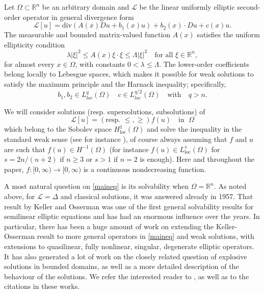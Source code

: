 \documentclass[12pt,a4paper]{amsart}
\numberwithin{equation}{section} %
\theoremstyle{definition}
\theoremstyle{remark}
\def \div {\mathrm{div}}
\begin{document}
Let $\Omega \subset \mathbb{R}^n$ be an arbitrary domain and $\mathcal{L}$ be the linear uniformly elliptic second-order operator in general divergence form 
\begin{equation}\label{form of the eq}
    \mathcal{L}[u] = \div\left(A(x)Du + b_1(x)u\right) + b_2(x) \cdot Du + c(x)u.
\end{equation}
The measurable and bounded matrix-valued function $A(x)$  satisfies the uniform ellipticity condition  
$$
    \lambda |\xi|^2 \leq A(x)\xi \cdot \xi \leq \Lambda |\xi|^2 \quad \text{for all } \xi \in \mathbb{R}^n,
$$  
for almost every $x \in \Omega$, with constants $0 < \lambda \leq \Lambda$. The lower-order coefficients belong locally to Lebesgue spaces, which makes it possible for weak solutions to satisfy the maximum principle and the Harnack inequality; specifically,
\begin{equation}\label{integrability of exponents}
    b_1,b_2 \in L^q_{loc}(\Omega) \quad c \in L^{q/2}_{loc}(\Omega) \quad \text{with} \quad q > n.
\end{equation}  

We will consider solutions (resp. supersolutions, subsolutions) of 
\begin{equation}\label{maineq}
    \mathcal{L}[u] = (\mbox{resp. }\le, \ge) f(u)\quad \mbox{in }\; \Omega
\end{equation}
which belong to the Sobolev space $H^1_{\mathrm{loc}}(\Omega)$ and solve the inequality in the standard weak sense (see for instance \cite[Chapter 8]{GT}), of course always assuming that $f$ and $u$ are such that $f(u)\in H^{-1}(\Omega)$ (for instance $f(u)\in L^s_{\mathrm{loc}}(\Omega)$ for $s=2n/(n+2)$ if $n\ge 3$ or $s>1$ if $n=2$ is enough). Here and throughout the paper, $f\colon[0,\infty)\to [0,\infty)$ is a continuous nondecreasing function.

A most natural question on \eqref{maineq} is its solvability when $\Omega=\mathbb{R}^n$. As noted above, for $\mathcal{L}=\Delta$ and classical solutions, it was answered already in 1957. That result by Keller and Osserman was one of the first general solvability results for semilinear elliptic equations and has had an enormous influence over the years. 
 In particular, there has been a huge amount of work on extending the Keller-Osserman result to more general operators in \eqref{maineq} and weak solutions, with extensions to quasilinear, fully nonlinear, singular, degenerate elliptic operators. It has also generated a lot of work on the closely related question of explosive solutions in bounded domains, as well as a more detailed description of the behaviour of the solutions. We refer the interested reader to \cites{AGQ, CDLV14, CDLV16, DGGW, Fa, FSs, FS, FQS13,  FPRArma, FPR,  K13, Ra}, as well as to the citations in these works. 
 
\end{document}
